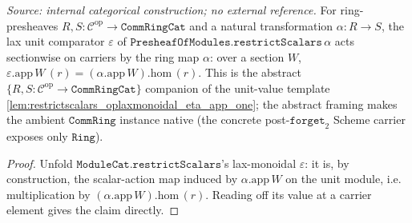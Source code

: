 \begin{lemma}

  \label{lem:restrictscalars_laxmonoidal_eps_app}
  \textit{Source: internal categorical construction; no external reference.}
  For ring-presheaves \(R, S : \mathcal C^{\mathrm{op}} \to \mathtt{CommRingCat}\) and a natural
  transformation \(\alpha : R \to S\), the lax unit comparator \(\varepsilon\) of
  \(\mathtt{PresheafOfModules.restrictScalars}\,\alpha\) acts sectionwise on carriers by the ring map
  \(\alpha\): over a section \(W\), \(\varepsilon.\mathrm{app}\,W\,(r) = (\alpha.\mathrm{app}\,W).\mathrm{hom}\,(r)\).
  This is the abstract \(\{R,S : \mathcal C^{\mathrm{op}} \to \mathtt{CommRingCat}\}\) companion of the
  unit-value template \cref{lem:restrictscalars_oplaxmonoidal_eta_app_one}; the abstract framing makes
  the ambient \(\mathtt{CommRing}\) instance native (the concrete post-\(\mathtt{forget}_2\) Scheme
  carrier exposes only \(\mathtt{Ring}\)).
\end{lemma}
\begin{proof}
  \leanok
  Unfold \(\mathtt{ModuleCat.restrictScalars}\)'s lax-monoidal \(\varepsilon\): it is, by construction,
  the scalar-action map induced by \(\alpha.\mathrm{app}\,W\) on the unit module, i.e. multiplication by
  \((\alpha.\mathrm{app}\,W).\mathrm{hom}\,(r)\). Reading off its value at a carrier element gives the
  claim directly.
\end{proof}

